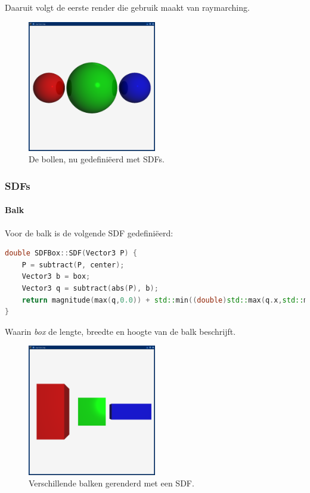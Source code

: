 \documentclass[12pt, a4paper]{article}
\begin{document}
Daaruit volgt de eerste render die gebruik maakt van raymarching.

\begin{figure}[H]
    \centering
    \includegraphics[width=0.50\textwidth]{renders/first_raymarched.png}
    \caption{De bollen, nu gedefiniëerd met SDFs.}
    \label{fig:first_raymarched}
\end{figure}

\clearpage

\subsubsection{SDFs}

\paragraph{Balk}
Voor de balk is de volgende SDF gedefiniëerd:
\begin{lstlisting}[language=C++]
double SDFBox::SDF(Vector3 P) {
    P = subtract(P, center);
    Vector3 b = box;
    Vector3 q = subtract(abs(P), b);
    return magnitude(max(q,0.0)) + std::min((double)std::max(q.x,std::max(q.y,q.z)),0.0);
}
\end{lstlisting}
Waarin \emph{box} de lengte, breedte en hoogte van de balk beschrijft.

\begin{figure}[H]
    \centering
    \includegraphics[width=0.50\textwidth]{renders/boxes.png}
    \caption{Verschillende balken gerenderd met een SDF.}
    \label{fig:boxes}
\end{figure}
\end{document}
